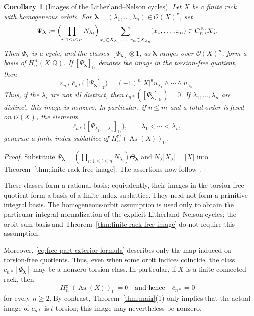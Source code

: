 \documentclass[11pt]{article}
\newtheorem{corollary}[theorem]{Corollary}
\DeclareMathOperator{\As}{As}
\newcommand{\QQ}{\mathbb Q}
\newcommand{\OO}{\mathcal O}
\newcommand{\gr}{\mathrm{gr}}
\newcommand{\R}{\mathrm R}
\begin{document}
\begin{corollary}[Images of the Litherland--Nelson cycles]
Let $X$ be a finite rack with homogeneous orbits. For
$\boldsymbol\lambda=(\lambda_1,\ldots,\lambda_n)\in\OO(X)^n$, set
\[
\Psi_{\boldsymbol\lambda}
 :=\Bigl(\prod_{i:\,1\le i\le n}N_{\lambda_i}\Bigr)
 \sum_{x_1\in X_{\lambda_1},\,\ldots,\,x_n\in X_{\lambda_n}}
 (x_1,\ldots,x_n)
 \in C_n^\R(X).
\]
Then $\Psi_{\boldsymbol\lambda}$ is a cycle, and the classes
$[\Psi_{\boldsymbol\lambda}]\otimes1$, as
$\boldsymbol\lambda$ ranges over $\OO(X)^n$, form a basis of
$H_n^\R(X;\QQ)$. If
$[\Psi_{\boldsymbol\lambda}]_{\mathrm{fr}}$ denotes the image in the
torsion-free quotient, then
\[
\overline\varepsilon_{n*}\,\overline c_{n*}
 \bigl([\Psi_{\boldsymbol\lambda}]_{\mathrm{fr}}\bigr)
 =(-1)^n|X|^n
 u_{\lambda_1}\wedge\cdots\wedge u_{\lambda_n}.
\]
Thus, if the $\lambda_i$ are not all distinct, then
$\overline c_{n*}([\Psi_{\boldsymbol\lambda}]_{\mathrm{fr}})=0$. If
$\lambda_1,\ldots,\lambda_n$ are distinct, this image is nonzero. In
particular, if $n\le m$ and a total order is fixed on $\OO(X)$, the elements
\[
 \overline c_{n*}
 \bigl([\Psi_{\lambda_1,\ldots,\lambda_n}]_{\mathrm{fr}}\bigr),
 \qquad \lambda_1<\cdots<\lambda_n,
\]
generate a finite-index sublattice of
$H_n^{\gr}(\As(X))_{\mathrm{fr}}$.
\end{corollary}

\begin{proof}
Substitute
$\Psi_{\boldsymbol\lambda}=(\prod_{i:\,1\le i\le n}N_{\lambda_i})
\Theta_{\boldsymbol\lambda}$ and
$N_\lambda|X_\lambda|=|X|$ into
Theorem~\ref{thm:finite-rack-free-image}. The assertions now follow
\cite[\S3]{LitherlandNelson}.
\end{proof}

These classes form a rational basis; equivalently, their images in
the torsion-free quotient form a basis of a finite-index sublattice.
They need not form a primitive integral basis. The homogeneous-orbit
assumption is used only to obtain the particular integral
normalization of the explicit Litherland--Nelson cycles; the orbit-sum
basis and Theorem~\ref{thm:finite-rack-free-image} do not require this
assumption.

Moreover, \eqref{eq:free-part-exterior-formula} describes only the map
induced on torsion-free quotients. Thus, even when some orbit indices
coincide, the class $c_{n*}[\Psi_{\boldsymbol\lambda}]$ may be a nonzero
torsion class. In particular, if $X$ is a finite connected rack, then
\[
 H_n^{\gr}(\As(X))_{\mathrm{fr}}=0
 \quad\text{and hence}\quad
 \overline c_{n*}=0
\]
for every $n\ge2$. By contrast, Theorem~\ref{thm:main}(1) only implies
that the actual image of $c_{n*}$ is $t$-torsion; this image may nevertheless
be nonzero.
\end{document}
